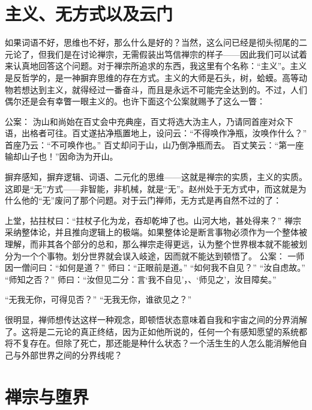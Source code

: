 \section{主义、无方式以及云门}

如果词语不好，思维也不好，那么什么是好的？当然，这么问已经是彻头彻尾的二元论了，但我们是在讨论禅宗，无需假装出笃信禅宗的样子——因此我们可以试着来认真地回答这个问题。对于禅宗所追求的东西，我这里有个名称：“主义”。主义是反哲学的，是一神摒弃思维的存在方式。主义的大师是石头，树，蛤蟆。高等动物若想达到主义，就得经过一番奋斗，而且是永远不可能完全达到的。不过，人们偶尔还是会有幸瞥一眼主义的。也许下面这个公案就赐予了这么一瞥：

\begin{zenkoan}
公案：
沩山和尚始在百丈会中充典座，百丈将选大沩主人，乃请同首座对众下语，出格者可往。百丈遂拈净瓶置地上，设问云：“不得唤作净瓶，汝唤作什么？”
首座乃云：“不可唤作也。”
百丈却问于山，山乃倒净瓶而去。
百丈笑云：“第一座输却山子也！”因命沩为开山。
\end{zenkoan}

摒弃感知，摒弃逻辑、词语、二元化的思维——这就是禅宗的实质，主义的实质。这即是“无”方式——非智能，非机械，就是“无”。赵州处于无方式中，而这就是为什么他的“无”废问了那个问题。对于云门禅师，无方式是再自然不过的了：

\begin{zenkoan}
上堂，拈拄杖曰：“拄杖子化为龙，吞却乾坤了也。山河大地，甚处得来？”
禅宗采纳整体论，并且推向逻辑上的极端。如果整体论是断言事物必须作为一个整体被理解，而非其各个部分的总和，那么禅宗走得更远，认为整个世界根本就不能被划分为一个个事物。划分世界就会误入岐途，因而就不能达到顿悟了。
公案：
一师因一僧问曰：“如何是道？”
师曰：“正眼前是道。”
“如何我不自见？”
“汝自虑故。”
“师知之否？”
师曰：“汝但见二分：言‘我不自见’，、‘师见之’，汝目障矣。”
\begin{zenkoan}
“无我无你，可得见否？”
“无我无你，谁欲见之？”
\end{zenkoan}
\end{zenkoan}

很明显，禅师想传达这样一种观念，即顿悟状态意味着自我和宇宙之间的分界消解了。这将是二元论的真正终结，因为正如他所说的，任何一个有感知愿望的系统都将不复存在。但除了死亡，那还能是种什么状态？一个活生生的人怎么能消解他自己与外部世界之间的分界线呢？

\section{禅宗与堕界}


